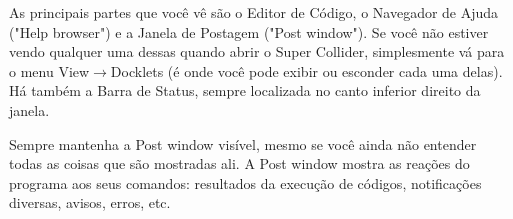 As principais partes que você vê são o Editor de Código, o Navegador de Ajuda ("Help browser") e a Janela de Postagem ("Post window"). Se você não estiver vendo qualquer uma dessas quando abrir o Super Collider, simplesmente vá para o menu View$\rightarrow$Docklets (é onde você pode exibir ou esconder cada uma delas). Há também a Barra de Status, sempre localizada no canto inferior direito da janela.

Sempre mantenha a Post window visível, mesmo se você ainda não entender todas as coisas que são mostradas ali. A Post window mostra as reações do programa aos seus comandos: resultados da execução de códigos, notificações diversas, avisos, erros, etc.

\bigskip
{}
\bigskip


